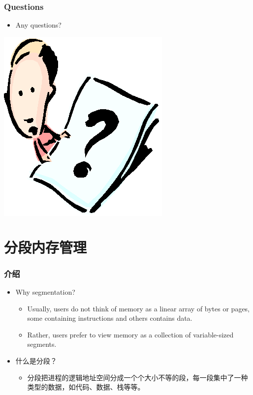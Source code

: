 \documentclass[CJKutf8,xcolor=pdftex,dvipsnames,table]{beamer}
\begin{document}
\begin{CJK*}{UTF8}{song}
  \begin{frame}
  \frametitle{Questions}
  \begin{itemize}
  \item{Any questions?}
  \end{itemize}
  \begin{center}
    \includegraphics[scale=.5]{question}
  \end{center}
  \end{frame}

\section{分段内存管理}  
  
  \begin{frame}
  \frametitle{介绍} \pause
  \begin{itemize}
  \item{Why segmentation?} \pause
    \begin{itemize}
    \item{Usually, users do not think of memory as a linear array of bytes or pages, some containing instructions and others contains data.} \pause
    \item{Rather, users prefer to view memory as a collection of variable-sized segments.} \pause
    \end{itemize}
  \item{什么是分段？} \pause
    \begin{itemize}
    \item{分段把进程的逻辑地址空间分成一个个大小不等的段，每一段集中了一种类型的数据，如代码、数据、栈等等。}
    \end{itemize}
  \end{itemize}
  \end{frame}
  

\end{CJK*}
\end{document}
